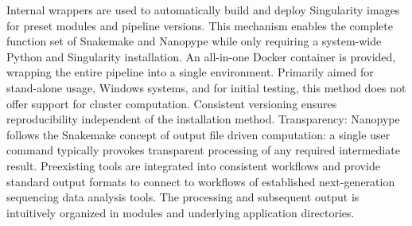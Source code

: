 Internal wrappers are used to automatically build and deploy Singularity images for preset modules and pipeline versions. This mechanism enables the complete function set of Snakemake and Nanopype while only requiring a system-wide Python and Singularity installation.
An all-in-one Docker container is provided, wrapping the entire pipeline into a single environment. Primarily aimed for stand-alone usage, Windows systems, and for initial testing, this method does not offer support for cluster computation. Consistent versioning ensures reproducibility independent of the installation method.
Transparency: Nanopype follows the Snakemake concept of output file driven computation: a single user command typically provokes transparent processing of any required intermediate result. Preexisting tools are integrated into consistent workflows and provide standard output formats to connect to workflows of established next-generation sequencing data analysis tools. The processing and subsequent output is intuitively organized in modules and underlying application directories.

